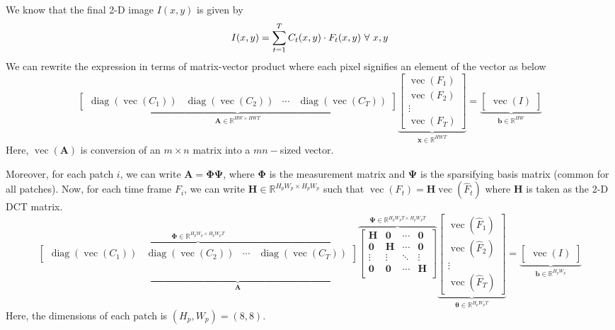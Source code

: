 \documentclass{article}
\newcommand{\op}{\operatorname}
\begin{document}
\begin{enumerate}
We know that the final 2-D image $I(x,y)$ is given by
\begin{equation}{\label{eq:hitomi}}
I(x,y) = \sum_{t=1}^T C_t(x,y)\cdot F_t(x,y)\ \forall\ x,y
\end{equation}
We can rewrite the expression in terms of matrix-vector product where each pixel signifies an element of the vector as below
\begin{equation}
\underbrace{
	\begin{bmatrix}
	\op{diag}(\op{vec}(C_1)) & \op{diag}(\op{vec}(C_2)) & \cdots & \op{diag}(\op{vec}(C_T))
	\end{bmatrix}
}_{\bm{A}\in\mathbb{R}^{HW\times HWT}}
\underbrace{
	\begin{bmatrix}
	\op{vec}(F_1) \\ \op{vec}(F_2) \\ \vdots \\ \op{vec}(F_T)
	\end{bmatrix}
}_{\bm{x}\in\mathbb{R}^{HWT}}
=
\underbrace{
	\begin{bmatrix}
	\op{vec}(I)
	\end{bmatrix}
}_{\bm{b}\in\mathbb{R}^{HW}}
\end{equation}
Here, $\op{vec}(\bm{A})$ is conversion of an $m\times n$ matrix into a $mn-$sized vector. 


Moreover, for each patch $i$, we can write $\bm{A}=\bm{\Phi}\bm{\Psi}$, where $\bm{\Phi}$ is the measurement matrix and $\bm{\Psi}$ is the sparsifying basis matrix (common for all patches). Now, for each time frame $F_i$, we can write $\bm{H}\in\mathbb{R}^{H_pW_p\times H_pW_p}$ such that $\op{vec}(F_t) = \bm{H}\op{vec}(\hat{F}_t)$ where $\bm{H}$ is taken as the 2-D DCT matrix.
\begin{equation}
\underbrace{
	\overbrace{
		\begin{bmatrix}
			\op{diag}(\op{vec}(C_1)) & \op{diag}(\op{vec}(C_2)) & \cdots & \op{diag}(\op{vec}(C_T))
		\end{bmatrix}
	}^{\bm{\Phi}\in\mathbb{R}^{H_pW_p\times H_pW_pT}}
	\overbrace{
		\begin{bmatrix}
			\bm{H} & \bm{0} & \cdots & \bm{0}\\
			\bm{0} & \bm{H} & \cdots & \bm{0}\\
			\vdots & \vdots & \ddots & \vdots\\
			\bm{0} & \bm{0} & \cdots & \bm{H}\\
		\end{bmatrix}
	}^{\bm{\Psi}\in\mathbb{R}^{H_pW_pT\times H_pW_pT}}
}_{\bm{A}}
\underbrace{
	\begin{bmatrix}
	\op{vec}(\hat{F}_1) \\ \op{vec}(\hat{F}_2) \\ \vdots \\ \op{vec}(\hat{F}_T)
	\end{bmatrix}
}_{\bm{\theta}\in\mathbb{R}^{H_pW_pT}}
=
\underbrace{
	\begin{bmatrix}
	\op{vec}(I)
	\end{bmatrix}
}_{\bm{b}\in\mathbb{R}^{H_pW_p}}
\end{equation}
Here, the dimensions of each patch is $(H_p, W_p)=(8,8)$. \newline



\end{enumerate}
\end{document}
